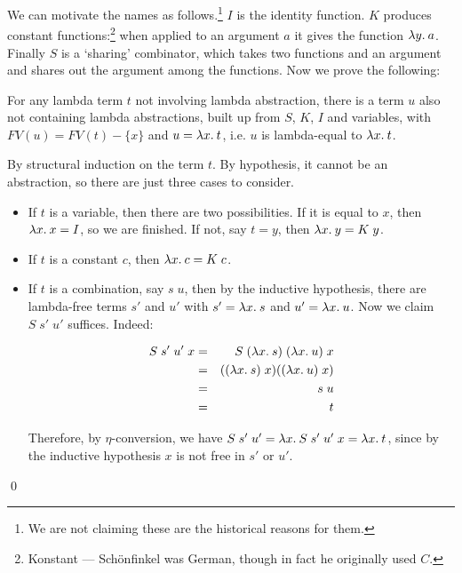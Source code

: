 We can motivate the names as follows.\footnote{We are not claiming these are
the historical reasons for them.} $I$ is the identity function. $K$ produces
constant functions:\footnote{Konstant --- Sch\"onfinkel was German, though in
fact he originally used $C$.} when applied to an argument $a$ it gives the
function $\lambda y.\: a$. Finally $S$ is a `sharing' combinator, which takes two
functions and an argument and shares out the argument among the functions. Now
we prove the following:

\begin{lemma}
For any lambda term $t$ not involving lambda abstraction, there is a term $u$
also not containing lambda abstractions, built up from $S$, $K$, $I$ and
variables, with $FV(u) = FV(t) - \{x\}$ and $u = \lambda x.\: t$, i.e. $u$ is
lambda-equal to $\lambda x.\: t$.

\proof By structural induction on the term $t$. By hypothesis, it cannot
be an abstraction, so there are just three cases to consider.

\begin{itemize}

\item If $t$ is a variable, then there are two possibilities. If it is equal to
$x$, then $\lambda x.\: x = I$, so we are finished. If not, say $t = y$, then
$\lambda x.\: y = K\; y$.

\item If $t$ is a constant $c$, then $\lambda x.\: c = K\; c$.

\item If $t$ is a combination, say $s\; u$, then by the inductive hypothesis,
there are lambda-free terms $s'$ and $u'$ with $s' = \lambda x.\: s$ and $u' =
\lambda x.\: u$. Now we claim $S\;s'\;u'$ suffices. Indeed:

\begin{eqnarray*}
S\;s'\;u'\;x & = & S\;(\lambda x.\: s)\; (\lambda x.\: u)\; x     \\
             & = & ((\lambda x.\: s)\; x) ((\lambda x.\: u)\; x)  \\
             & = & s\; u                                  \\
             & = & t
\end{eqnarray*}

Therefore, by $\eta$-conversion, we have $S\;s'\;u' = \lambda x.\: S\;s'\;u'\; x =
\lambda x.\: t$, since by the inductive hypothesis $x$ is not free in $s'$ or $u'$.

\end{itemize}

\qed

\end{lemma}

